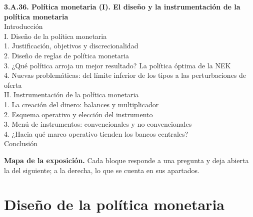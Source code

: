 \documentclass[11pt]{article}
\begin{document}
\begin{esquema}[unbreakable]
\textbf{3.A.36. Política monetaria (I). El diseño y la instrumentación de la política monetaria}\\[2pt]
Introducción\\
I. Diseño de la política monetaria\\
\hspace*{1.5em}1. Justificación, objetivos y discrecionalidad\\
\hspace*{1.5em}2. Diseño de reglas de política monetaria\\
\hspace*{1.5em}3. ¿Qué política arroja un mejor resultado? La política óptima de la NEK\\
\hspace*{1.5em}4. Nuevas problemáticas: del límite inferior de los tipos a las perturbaciones de oferta\\
II. Instrumentación de la política monetaria\\
\hspace*{1.5em}1. La creación del dinero: balances y multiplicador\\
\hspace*{1.5em}2. Esquema operativo y elección del instrumento\\
\hspace*{1.5em}3. Menú de instrumentos: convencionales y no convencionales\\
\hspace*{1.5em}4. ¿Hacia qué marco operativo tienden los bancos centrales?\\
Conclusión
\end{esquema}

\begin{anotaciones}
\textbf{Mapa de la exposición.} Cada bloque responde a una pregunta y deja abierta la del siguiente; a la derecha, lo que se cuenta en sus apartados.
\begin{infografiacaja}
\caption{Mapa de la exposición: la pregunta de cada bloque y el hilo que los une}\label{figu:mapa-tema}
\end{infografiacaja}
\end{anotaciones}



\section{Diseño de la política monetaria}\label{sec:diseno}
\end{document}
